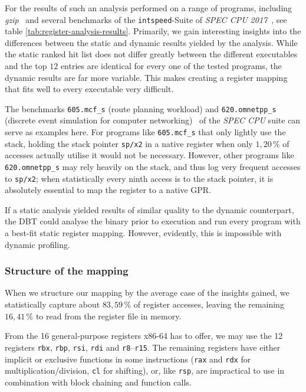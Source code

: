 For the results of such an analysis performed on a range of programs, including \textit{gzip}~\cite{gzip} and several benchmarks of the \texttt{intspeed}-Suite of \textit{SPEC CPU 2017}~\cite{spec-cpu-2017}, see table \vref{tab:register-analysis-results}.
Primarily, we gain interesting insights into the differences between the static and dynamic results yielded by the analysis.
While the static ranked hit list does not differ greatly between the different executables and the top $12$ entries are identical for every one of the tested programs, the dynamic results are far more variable.
This makes creating a register mapping that fits well to every executable very difficult.

The benchmarks \texttt{605.mcf\_s} (route planning workload) and \texttt{620.omnetpp\_s} (discrete event simulation for computer networking)~\cite{spec-cpu-doc} of the \textit{SPEC CPU} suite can serve as examples here.
For programs like \texttt{605.mcf\_s} that only lightly use the stack, holding the stack pointer \texttt{sp/x2} in a native register when only $1,20\,\%$ of accesses actually utilise it would not be necessary.
However, other programs like \texttt{620.omnetpp\_s} may rely heavily on the stack, and thus log very frequent accesses to \texttt{sp/x2};
when statistically every ninth access is to the stack pointer, it is absolutely essential to map the register to a native GPR.

If a static analysis yielded results of similar quality to the dynamic counterpart, the DBT could analyse the binary prior to execution and run every program with a best-fit static register mapping.
However, evidently, this is impossible with dynamic profiling.


\subsubsection{Structure of the mapping}
When we structure our mapping by the average case of the insights gained, we statistically capture about $83,59\,\%$ of register accesses, leaving the remaining $16,41\,\%$ to read from the register file in memory.

From the 16 general-purpose registers x86-64 has to offer, we may use the 12 registers \texttt{rbx}, \texttt{rbp}, \texttt{rsi}, \texttt{rdi} and \texttt{r8}--\texttt{r15}.
The remaining registers have either implicit or exclusive functions in some instructions (\texttt{rax} and \texttt{rdx} for multiplication/division, \texttt{cl} for shifting), or, like \texttt{rsp}, are impractical to use in combination with block chaining and function calls.

